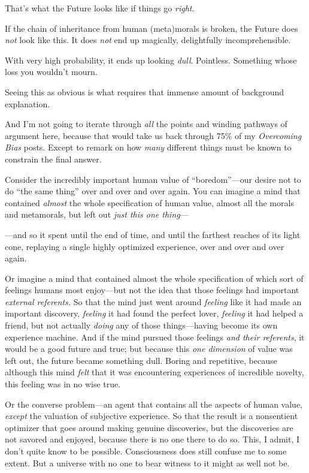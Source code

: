 {
 That's what the Future looks like if things go
\textit{right}.}

{
 If the chain of inheritance from human (meta)morals is broken, the
Future does \textit{not} look like this. It does \textit{not} end up
magically, delightfully incomprehensible.}

{
 With very high probability, it ends up looking \textit{dull}.
Pointless. Something whose loss you wouldn't mourn.}

{
 Seeing this as obvious is what requires that immense amount of
background explanation.}

{
 And I'm not going to iterate through \textit{all}
the points and winding pathways of argument here, because that would
take us back through 75\% of my \textit{Overcoming Bias} posts. Except
to remark on how \textit{many} different things must be known to
constrain the final answer.}

{
 Consider the incredibly important human value of
``boredom''{}---our desire not to do
``the same thing'' over and over and
over again. You can imagine a mind that contained \textit{almost} the
whole specification of human value, almost all the morals and
metamorals, but left out \textit{just this one thing}{}---}

{
 {}---and so it spent until the end of time, and until the farthest
reaches of its light cone, replaying a single highly optimized
experience, over and over and over again.}

{
 Or imagine a mind that contained almost the whole specification of
which sort of feelings humans most enjoy---but not the idea that those
feelings had important \textit{external referents.} So that the mind
just went around \textit{feeling} like it had made an important
discovery, \textit{feeling} it had found the perfect lover,
\textit{feeling} it had helped a friend, but not actually
\textit{doing} any of those things---having become its own experience
machine. And if the mind pursued those feelings \textit{and their
referents}, it would be a good future and true; but because this
\textit{one dimension} of value was left out, the future became
something dull. Boring and repetitive, because although this mind
\textit{felt} that it was encountering experiences of incredible
novelty, this feeling was in no wise true.}

{
 Or the converse problem---an agent that contains all the aspects
of human value, \textit{except} the valuation of subjective experience.
So that the result is a nonsentient optimizer that goes around making
genuine discoveries, but the discoveries are not savored and enjoyed,
because there is no one there to do so. This, I admit, I
don't quite know to be possible. Consciousness does
still confuse me to some extent. But a universe with no one to bear
witness to it might as well not be.}

